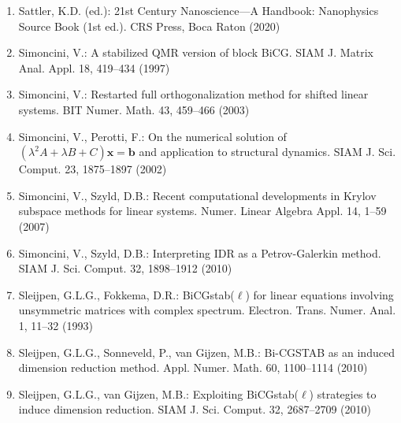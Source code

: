 \begin{enumerate}[label=\arabic*.,ref=\arabic*,leftmargin=3em]
\item\label{bib:source-156}Sattler, K.D. (ed.): 21st Century Nanoscience—A Handbook: Nanophysics Source Book (1st ed.). CRS Press, Boca Raton (2020)

\item\label{bib:source-157}Simoncini, V.: A stabilized QMR version of block BiCG. SIAM J. Matrix Anal. Appl. 18, 419–434 (1997)

\item\label{bib:source-158}Simoncini, V.: Restarted full orthogonalization method for shifted linear systems. BIT Numer. Math. 43, 459–466 (2003)

\item\label{bib:source-159}Simoncini, V., Perotti, F.: On the numerical solution of $(\lambda^2 A+\lambda B+C)\boldsymbol{x}=\boldsymbol{b}$ and application to structural dynamics. SIAM J. Sci. Comput. 23, 1875–1897 (2002)

\item\label{bib:source-160}Simoncini, V., Szyld, D.B.: Recent computational developments in Krylov subspace methods for linear systems. Numer. Linear Algebra Appl. 14, 1–59 (2007)

\item\label{bib:source-161}Simoncini, V., Szyld, D.B.: Interpreting IDR as a Petrov-Galerkin method. SIAM J. Sci. Comput. 32, 1898–1912 (2010)

\item\label{bib:source-162}Sleijpen, G.L.G., Fokkema, D.R.: BiCGstab($\ell$) for linear equations involving unsymmetric matrices with complex spectrum. Electron. Trans. Numer. Anal. 1, 11–32 (1993)

\item\label{bib:source-163}Sleijpen, G.L.G., Sonneveld, P., van Gijzen, M.B.: Bi-CGSTAB as an induced dimension reduction method. Appl. Numer. Math. 60, 1100–1114 (2010)

\item\label{bib:source-164}Sleijpen, G.L.G., van Gijzen, M.B.: Exploiting BiCGstab($\ell$) strategies to induce dimension reduction. SIAM J. Sci. Comput. 32, 2687–2709 (2010)


\end{enumerate}
